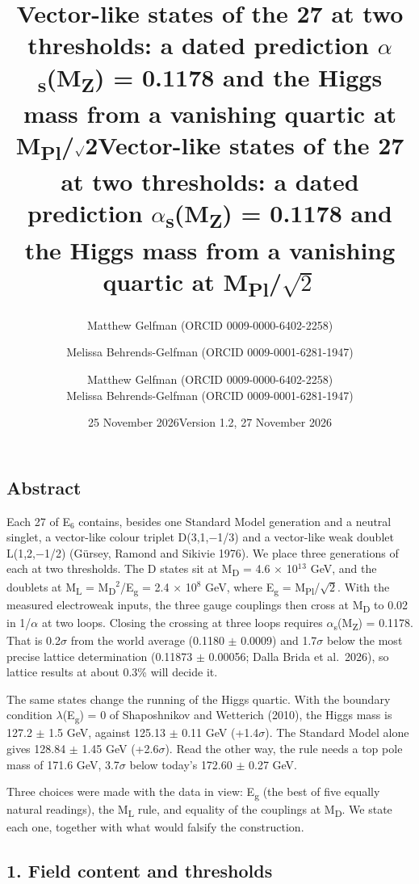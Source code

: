 \documentclass[
  11pt,
]{article}
\title{Vector-like states of the 27 at two thresholds: a dated
prediction \ensuremath{\alpha}\textsubscript{s}(M\textsubscript{Z}) = 0.1178 and the Higgs
mass from a vanishing quartic at M\textsubscript{Pl}/\ensuremath{\surd}2}
\author{Matthew Gelfman (ORCID 0009-0000-6402-2258) \and Melissa
Behrends-Gelfman (ORCID 0009-0001-6281-1947)}
\date{25 November 2026}
\title{Vector-like states of the 27 at two thresholds: a dated prediction
\ensuremath{\alpha}\textsubscript{s}(M\textsubscript{Z}) = 0.1178 and the Higgs mass from
a vanishing quartic at M\textsubscript{Pl}/\ensuremath{\sqrt{2}}}
\author{Matthew Gelfman (ORCID 0009-0000-6402-2258) \\ Melissa Behrends-Gelfman (ORCID 0009-0001-6281-1947)}
\date{Version 1.2, 27 November 2026}
\begin{document}
\maketitle
\hypertarget{abstract}{%
\subsection{Abstract}\label{abstract}}

Each 27 of E\ensuremath{_{6}} contains, besides one Standard Model generation and a neutral singlet, a vector-like colour triplet D(3,1,\ensuremath{-}1/3) and a vector-like weak doublet L(1,2,\ensuremath{-}1/2) (Gürsey, Ramond and Sikivie 1976). We place three generations of each at two thresholds. The D states sit at M\textsubscript{D} = 4.6 \ensuremath{\times} 10\ensuremath{^{1}}\ensuremath{^{3}} GeV, and the doublets at M\textsubscript{L} = M\textsubscript{D}\ensuremath{^{2}}/E\textsubscript{g} = 2.4 \ensuremath{\times} 10\ensuremath{^{8}} GeV, where E\textsubscript{g} = M\textsubscript{Pl}/\ensuremath{\sqrt{2}}. With the measured electroweak inputs, the three gauge couplings then cross at M\textsubscript{D} to 0.02 in 1/\ensuremath{\alpha} at two loops. Closing the crossing at three loops requires \ensuremath{\alpha}\textsubscript{s}(M\textsubscript{Z}) = 0.1178. That is 0.2\ensuremath{\sigma} from the world average (0.1180 \ensuremath{\pm} 0.0009) and 1.7\ensuremath{\sigma} below the most precise lattice determination (0.11873 \ensuremath{\pm} 0.00056; Dalla Brida et al.~2026), so lattice results at about 0.3\% will decide it.

The same states change the running of the Higgs quartic. With the boundary condition \ensuremath{\lambda}(E\textsubscript{g}) = 0 of Shaposhnikov and Wetterich (2010), the Higgs mass is 127.2 \ensuremath{\pm} 1.5 GeV, against 125.13 \ensuremath{\pm} 0.11 GeV (+1.4\ensuremath{\sigma}). The Standard Model alone gives 128.84 \ensuremath{\pm} 1.45 GeV (+2.6\ensuremath{\sigma}). Read the other way, the rule needs a top pole mass of 171.6 GeV, 3.7\ensuremath{\sigma} below today's 172.60 \ensuremath{\pm} 0.27 GeV.

Three choices were made with the data in view: E\textsubscript{g} (the best of five equally natural readings), the M\textsubscript{L} rule, and equality of the couplings at M\textsubscript{D}. We state each one, together with what would falsify the construction.

\hypertarget{field-content-and-thresholds}{%
\subsection{1. Field content and thresholds}\label{field-content-and-thresholds}}
\end{document}
